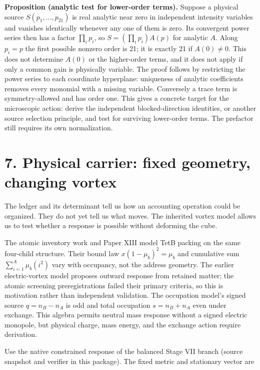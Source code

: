 \documentclass[
  11pt,
]{article}
\begin{document}
\textbf{Proposition (analytic test for lower-order terms).} Suppose a
physical source \(S(p_1,\ldots,p_{21})\) is real analytic near zero in
independent intensity variables and vanishes identically whenever any
one of them is zero. Its convergent power series then has a factor
\(\prod_i p_i\), so \(S=(\prod_i p_i)A(p)\) for analytic \(A\). Along
\(p_i=p\) the first possible nonzero order is 21; it is exactly 21 if
\(A(0)\ne0\). This does not determine \(A(0)\) or the higher-order
terms, and it does not apply if only a common gain is physically
variable. The proof follows by restricting the power series to each
coordinate hyperplane: uniqueness of analytic coefficients removes every
monomial with a missing variable. Conversely a trace term is
symmetry-allowed and has order one. This gives a concrete target for the
microscopic action: derive the independent blocked-direction identities,
or another source selection principle, and test for surviving
lower-order terms. The prefactor still requires its own normalization.

\section{7. Physical carrier: fixed geometry, changing
vortex}\label{physical-carrier-fixed-geometry-changing-vortex}

The ledger and its determinant tell us how an accounting operation could
be organized. They do not yet tell us what moves. The inherited vortex
model allows us to test whether a response is possible without deforming
the cube.

The atomic inventory work and Paper XIII model TetB packing on the same
four-child structure. Their bound law \(x(1-\mu_b)^2=\mu_b\) and
cumulative sum \(\sum_{i=1}^A\mu_b(i^2)\) vary with occupancy, not the
address geometry. The earlier electric-vortex model proposes outward
response from retained matter; the atomic screening preregistrations
failed their primary criteria, so this is motivation rather than
independent validation. The occupation model's signed source
\(q=n_B-n_A\) is odd and total occupation \(s=n_B+n_A\) even under
exchange. This algebra permits neutral mass response without a signed
electric monopole, but physical charge, mass energy, and the exchange
action require derivation.

Use the native constrained response of the balanced Stage VII branch
(source snapshot and verifier in this package). The fixed metric and
stationary vector are
\end{document}
